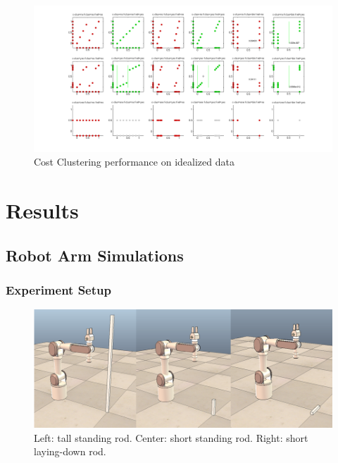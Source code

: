 \documentclass[12pt]{article}
\begin{document}
\begin{figure}[ht]
  \centerline{
  \includegraphics[width=1.5\columnwidth]{cluster_costs.png}}
  \caption{\label{fig_cluster_costs} Cost Clustering performance on idealized data}
  \label{fig:clustercosts}
\end{figure}

\section{Results}
\subsection{Robot Arm Simulations}
\subsubsection{Experiment Setup}

\begin{figure}[ht]
  \centering
  \includegraphics[width=0.9\columnwidth]{robots.png}
  \caption{\label{fig_robots} Left: tall standing rod. Center: short standing rod. Right: short laying-down rod.
  \label{fig:robots}
  }
\end{figure}
\end{document}
